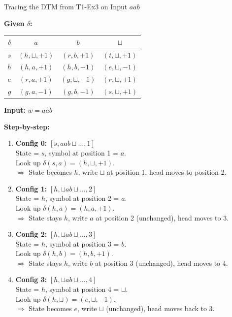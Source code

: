 \documentclass[11pt,a4paper]{article}
\newcommand{\blank}{\sqcup}
\begin{document}
\begin{examplebox}{Tracing the DTM from T1-Ex3 on Input $aab$}

\textbf{Given $\delta$:}
\begin{center}
\begin{tabular}{c|c|c|c}
$\delta$ & $a$ & $b$ & $\blank$ \\
\hline
$s$ & $(h, \blank, +1)$ & $(r, b, +1)$ & $(t, \blank, +1)$ \\
$h$ & $(h, a, +1)$ & $(h, b, +1)$ & $(e, \blank, -1)$ \\
$e$ & $(r, a, +1)$ & $(g, \blank, -1)$ & $(r, \blank, +1)$ \\
$g$ & $(g, a, -1)$ & $(g, b, -1)$ & $(s, \blank, +1)$ \\
\end{tabular}
\end{center}

\textbf{Input:} $w = aab$

\textbf{Step-by-step:}

\begin{enumerate}
    \item \textbf{Config 0:} $[s, aab\blank\ldots, 1]$\\
    State = $s$, symbol at position 1 = $a$.\\
    Look up $\delta(s, a) = (h, \blank, +1)$.\\
    $\Rightarrow$ State becomes $h$, write $\blank$ at position 1, head moves to position 2.

    \item \textbf{Config 1:} $[h, \blank ab\blank\ldots, 2]$\\
    State = $h$, symbol at position 2 = $a$.\\
    Look up $\delta(h, a) = (h, a, +1)$.\\
    $\Rightarrow$ State stays $h$, write $a$ at position 2 (unchanged), head moves to 3.

    \item \textbf{Config 2:} $[h, \blank ab\blank\ldots, 3]$\\
    State = $h$, symbol at position 3 = $b$.\\
    Look up $\delta(h, b) = (h, b, +1)$.\\
    $\Rightarrow$ State stays $h$, write $b$ at position 3 (unchanged), head moves to 4.

    \item \textbf{Config 3:} $[h, \blank ab\blank\ldots, 4]$\\
    State = $h$, symbol at position 4 = $\blank$.\\
    Look up $\delta(h, \blank) = (e, \blank, -1)$.\\
    $\Rightarrow$ State becomes $e$, write $\blank$ (unchanged), head moves back to 3.


\end{enumerate}
\end{examplebox}
\end{document}
